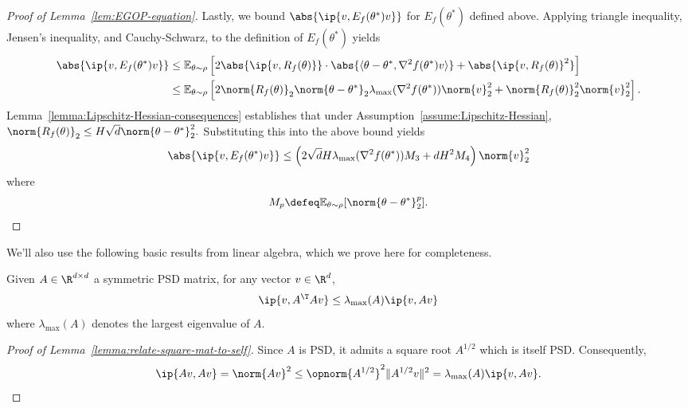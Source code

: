 \begin{proof}[Proof of Lemma~\ref{lem:EGOP-equation}]
   Lastly, we bound $\abs{\ip{v, E_f(\theta^*)v}}$ for $E_f(\theta^*)$ defined above. Applying triangle inequality, Jensen's inequality,  and Cauchy-Schwarz, to the definition of $E_f(\theta^*)$ yields
   \begin{align*}
       \abs{\ip{v, E_f (\theta^*) v}} &\leq \mathbb{E}_{\theta\sim \rho} \left[ 2\abs{\ip{v, R_f(\theta)}}\cdot \abs{\langle \theta-\theta^*, \nabla^2 f(\theta^*) v\rangle}+ \abs{\ip{v, R_f(\theta)}^2}\right]\\
       &\leq \mathbb{E}_{\theta\sim \rho} \left[ 2 \norm{R_f(\theta)}_2 \norm{\theta-\theta^*}_2 \lambda_{\max}(\nabla^2 f(\theta^*))\norm{v}^2_2 + \norm{R_f(\theta)}^2_2\norm{v}^2_2\right].
   \end{align*}
   Lemma~\ref{lemma:Lipschitz-Hessian-consequences} establishes that under Assumption~\ref{assume:Lipschitz-Hessian}, $\norm{R_f(\theta)}_2 \leq H\sqrt{d}\norm{\theta-\theta^*}^2_2.$ Substituting this into the above bound yields
   \[
    \abs{\ip{v, E_f (\theta^*) v}} \leq \left(2\sqrt{d}H \lambda_{\max}(\nabla^2 f(\theta^*)) M_3 + dH^2 M_4\right)\norm{v}^2_2
   \]
   where
   \[
    M_p \defeq \mathbb{E}_{\theta\sim\rho}[\norm{\theta-\theta^*}^{p}_2].
   \]
\end{proof}

We'll also use the following basic results from linear algebra, which we prove here for completeness.
\begin{lemma}\label{lemma:relate-square-mat-to-self}
    Given $A \in \R^{d\times d}$ a symmetric PSD matrix, for any vector $v\in \R^d$, 
    \[
        \ip{v, A^\T A v} \leq \lambda_{\max}(A)\ip{v, A v}
    \]
    where $\lambda_{\max}(A)$ denotes the largest eigenvalue of $A$.
\end{lemma}
\begin{proof}[Proof of Lemma~\ref{lemma:relate-square-mat-to-self}]
    Since $A$ is PSD, it admits a square root $A^{1/2}$ which is itself PSD. Consequently,
    \[
        \ip{Av, Av} =
        \norm{Av}^2 \leq
        \opnorm{A^{1/2}}^2 \| A^{1/2} v \|^2 =
        \lambda_{\max}(A) \ip{v, Av}.
    \]
\end{proof}

